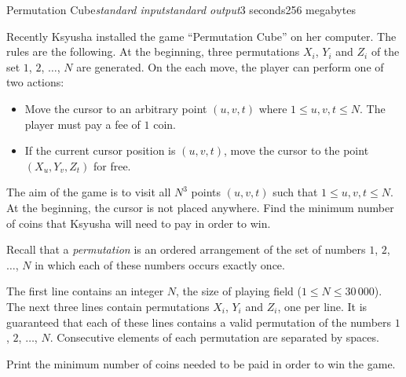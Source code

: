 \begin{problem}{Permutation Cube}{\textsl{standard input}}{\textsl{standard output}}{3 seconds}{256 megabytes}

Recently Ksyusha installed the game ``Permutation Cube'' on her computer. The rules are the following. At the beginning, three permutations $X_i$, $Y_i$ and $Z_i$ of the set $1$, $2$, $\dots$, $N$ are generated. On the each move, the player can perform one of two actions:
\begin{itemize}
\item Move the cursor to an arbitrary point $(u, v, t)$ where $1 \le u, v, t \le N$. The player must pay a fee of $1$ coin.
\item If the current cursor position is $(u, v, t)$, move the cursor to the point $(X_u, Y_v, Z_t)$ for free.
\end{itemize}
The aim of the game is to visit all $N^3$ points $(u, v, t)$ such that $1 \le u, v, t \le N$. At the beginning, the cursor is not placed anywhere. Find the minimum number of coins that Ksyusha will need to pay in order to win.

Recall that a \emph{permutation} is an ordered arrangement of the set of numbers $1$, $2$, $\dots$, $N$ in which each of these numbers occurs exactly once.

\InputFile
The first line contains an integer $N$, the size of playing field ($1 \le N \le 30\,000$). The next three lines contain permutations $X_i$, $Y_i$ and $Z_i$, one per line. It is guaranteed that each of these lines contains a valid permutation of the numbers $1$, $2$, $\dots$, $N$. Consecutive elements of each permutation are separated by spaces.

\OutputFile
Print the minimum number of coins needed to be paid in order to win the game.

\Examples

\begin{example}
%
%
\end{example}

\end{problem}
